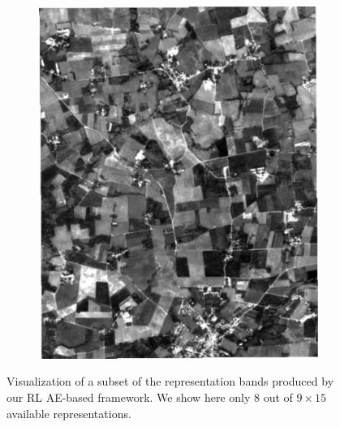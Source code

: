 \documentclass[journal,article,submit,pdftex,moreauthors]{Definitions/mdpi}
\begin{document}
\begin{figure}[H]
\begin{subfigure}[t]{0.23\linewidth}
	\caption{}
	\label{fig:r_aes_b2_6}
	\end{subfigure}
	\begin{subfigure}[t]{0.23\linewidth}
		\centering
		\includegraphics[height=\linewidth,width=0.95\linewidth]{figures/reconstruction_errors/reconstruction_B2_AEs7.pdf}
	\caption{}
	\label{fig:r_aes_b2_7}
	\end{subfigure}
	\caption{Visualization of a subset of the representation bands produced by our RL AE-based framework. We show here only 8 out of $9 \times 15$ available representations.}
	\label{representations}
\end{figure}

\end{document}
